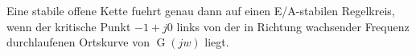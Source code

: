 Eine stabile offene Kette fuehrt genau dann auf einen E/A-stabilen Regelkreis, wenn der kritische Punkt $-1 + j0$ links von der in Richtung wachsender Frequenz durchlaufenen Ortskurve von $\operatorname{G}(jw)$ liegt.
